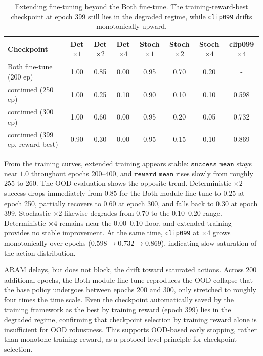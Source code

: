 \documentclass{llmxive}
\begin{document}
\begin{table}[t]
\centering
\scriptsize
\setlength{\tabcolsep}{3pt}
\begin{tabular}{lccccccc}
\toprule
Checkpoint & Det $\times1$ & Det $\times2$ & Det $\times4$
           & Stoch $\times1$ & Stoch $\times2$ & Stoch $\times4$ & clip099 $\times4$ \\
\midrule
Both fine-tune (200 ep)              & 1.00 & 0.85 & 0.00 & 0.95 & 0.70 & 0.20 & - \\
continued (250 ep)             & 1.00 & 0.25 & 0.10 & 0.90 & 0.10 & 0.10 & 0.598 \\
continued (300 ep)            & 1.00 & 0.60 & 0.00 & 0.95 & 0.20 & 0.05 & 0.732 \\
continued (399 ep, reward-best)
                                & 0.90 & 0.30 & 0.00 & 0.95 & 0.15 & 0.10 & 0.869 \\
\bottomrule
\end{tabular}
\caption{Extending fine-tuning beyond the Both fine-tune. The
training-reward-best checkpoint at epoch 399 still lies in the
degraded regime, while \texttt{clip099} drifts monotonically upward.}
\label{tab:contft}
\end{table}

From the training curves, extended training appears stable:
$\texttt{success\_mean}$ stays near $1.0$ throughout epochs
200--400, and $\texttt{reward\_mean}$ rises slowly from roughly 255
to 260. The OOD evaluation shows the opposite trend. Deterministic
$\times2$ success drops immediately from $0.85$ for
the Both-module fine-tune to $0.25$ at epoch 250, partially
recovers to $0.60$ at epoch 300, and falls back to $0.30$ at
epoch 399. Stochastic $\times2$ likewise degrades from $0.70$ to
the $0.10$--$0.20$ range. Deterministic $\times4$ remains near the
$0.00$--$0.10$ floor, and extended training provides no stable
improvement. At the same time, \texttt{clip099} at $\times4$ grows
monotonically over epochs ($0.598 \to 0.732 \to 0.869$), indicating
slow saturation of the action distribution.

ARAM delays, but does not block, the drift toward saturated actions.
Across 200 additional epochs,
the Both-module fine-tune reproduces the OOD collapse that
the base policy undergoes between epochs 200 and 300, only stretched
to roughly four times the time scale. Even the checkpoint
automatically saved by the training framework as the best by training
reward (epoch 399) lies in the degraded regime, confirming
that checkpoint selection by training reward alone is insufficient
for OOD robustness. This supports OOD-based early stopping, rather
than monotone training reward, as a protocol-level principle for
checkpoint selection.
\end{document}
